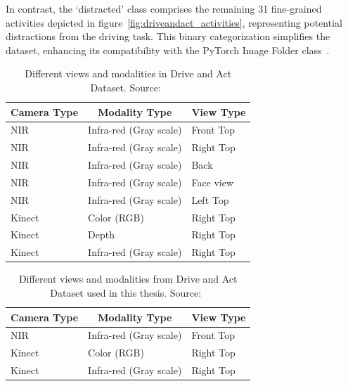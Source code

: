 In contrast, the `distracted' class comprises the remaining 31 fine-grained activities depicted in figure~\ref{fig:driveandact_activities}, representing potential distractions from the driving task. This binary categorization simplifies the dataset, enhancing its compatibility with the PyTorch Image Folder class~\citep{torchvision_imagefolder}.

\begin{table}[t]
\caption[Different views and modalities in Drive and Act Dataset.]{Different views and modalities in Drive and Act Dataset. Source:~\citep{martin2019drive_and_act_2019_iccv}}
\label{table for views and modalities in daa dataset}
\begin{center}
\small
\begin{tabular}{lll}
\multicolumn{1}{c}{\bf Camera Type}  &\multicolumn{1}{c}{\bf Modality Type} &\multicolumn{1}{c}{\bf View Type}
\\ \hline 
NIR         & Infra-red (Gray scale)  &Front Top
\\ \hline
NIR         & Infra-red (Gray scale)  &Right Top
\\ \hline 
NIR         & Infra-red (Gray scale)  &Back
\\ \hline 
NIR         & Infra-red (Gray scale)  &Face view
\\ \hline 
NIR         & Infra-red (Gray scale)  &Left Top
\\ \hline 
Kinect         & Color (RGB)  &Right Top
\\ \hline 
Kinect         & Depth  &Right Top
\\ \hline 
Kinect        & Infra-red (Gray scale)  &Right Top
\\ \hline 
\end{tabular}
\end{center}
\end{table}

\begin{table}[t]
\caption[Different views and modalities from Drive and Act Dataset used in this thesis.]{Different views and modalities from Drive and Act Dataset used in this thesis. Source:~\citep{martin2019drive_and_act_2019_iccv}}
\label{table for views and modalities used in this thesis}
\begin{center}
\small
\begin{tabular}{lll}
\multicolumn{1}{c}{\bf Camera Type}  &\multicolumn{1}{c}{\bf Modality Type} &\multicolumn{1}{c}{\bf View Type}
\\ \hline 
NIR         & Infra-red (Gray scale)  &Front Top
\\ \hline 
Kinect         & Color (RGB)  &Right Top
\\ \hline 
Kinect        & Infra-red (Gray scale)  &Right Top
\\ \hline
\end{tabular}
\end{center}
\end{table}

